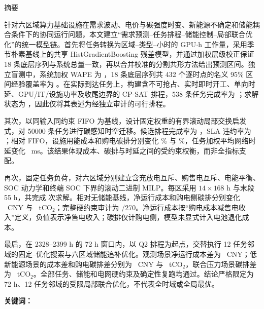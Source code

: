 \begin{center}
  {\heiti{} 摘\quad 要}
\end{center}

针对六区域算力基础设施在需求波动、电价与碳强度时变、新能源不确定和储能耦合条件下的协同运行问题，本文建立“需求预测--任务排程--储能控制--局部联合优化”的统一模型链。首先将任务转换为区域--类型--小时的 GPU$\cdot$h 工作量，采用季节朴素基线上的共享 HistGradientBoosting 残差模型，并通过加权层级校正保证 18 条底层序列与系统总量一致，再以合并校准的分割共形方法给出预测区间。独立盲测中，系统加权 WAPE 为 ，18 条底层序列共 432 个逐时点的名义 95\% 区间经验覆盖率为 。在实际到达任务上，构建含不可抢占、实时即时开工、单向时延、GPU/IT/设施功率及收尾边界的 CP-SAT 排程，538 条任务完成率为 ；求解状态为 ，因此仅将其表述为经独立审计的可行排程。

其次，以同输入同约束 FIFO 为基线，设计固定权重的有界滚动局部交换启发式，对 50000 条任务进行碳感知时空迁移。候选排程完成率为 ，SLA 违约率为 ；相对 FIFO，设施用能成本和购电碳排分别变化 \% 与 \%，任务加权平均网络时延变化 ~ms。该结果体现成本、碳排与时延之间的受约束权衡，而非全指标支配。

再次，固定任务负荷，对六区域分别建立含充放电互斥、购售电互斥、电能平衡、SOC 动力学和终端 SOC 下界的滚动二进制 MILP。每区采用 $14\times168$ h 与末段 55 h，共完成  次求解。相对无储能基线，净运行成本和购电侧碳排分别变化 ~CNY 与 ~tCO$_2$；完整硬约束审计为 /270。净运行成本按“购电成本减售电收入”定义，负值表示净售电收入；碳排仅计购电侧，模型未显式计入电池退化成本。

最后，在 2328--2399 h 的 72 h 窗口内，以 Q2 排程为起点，交替执行 12 任务邻域的固定--优化搜索与六区域储能追补优化。观测场景净运行成本差为 ~CNY；低新能源场景的成本差和购电碳排差分别为 ~CNY 与 ~tCO$_2$，联合压力场景碳排差为 ~tCO$_2$。全部任务、储能和电网硬约束及确定性复跑均通过。结论严格限定为 72 h、12 任务邻域的受限局部联合优化，不代表全时域或全局最优。

\noindent\textbf{关键词：}\PaperKeywords
